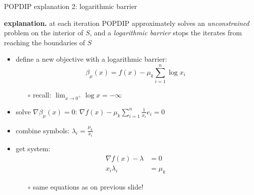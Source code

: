\documentclass[10pt,hyperref,dvipsnames]{beamer}
\newcommand{\grad}{\nabla}
\newcommand{\ds}{\displaystyle}
\begin{document}
\begin{frame}{POPDIP explanation 2: logarithmic barrier}

\textbf{explanation.}  at each iteration POPDIP approximately solves an \emph{unconstrained} problem on the interior of $S$, and a \emph{logarithmic barrier} stops the iterates from reaching the boundaries of $S$

\bigskip
\begin{itemize}
\item define a new objective with a logarithmic barrier:
\begin{equation*}
\beta_\mu(x) = f(x) - \mu_k \sum_{i=1}^n \log x_i
\end{equation*}

\vspace{-1mm}
    \begin{itemize}
    \item[$\circ$] recall: \quad $\ds \lim_{x\to 0^+} \log x = -\infty$
    \end{itemize}
\item solve $\grad \beta_\mu(x)=0$: \quad $\ds \grad f(x) - \mu_k \sum_{i=1}^n \frac{1}{x_i} e_i = 0$
\item combine symbols: $\ds \lambda_i = \frac{\mu_k}{x_i}$
\item get system:
\begin{align*}
\grad f(x) - \lambda &= 0 \\
       x_i \lambda_i &= \mu_k
\end{align*}

\vspace{-3mm}
    \begin{itemize}
    \item[$\circ$] same equations as on previous slide!
    \end{itemize}
\end{itemize}
\end{frame}
\end{document}
